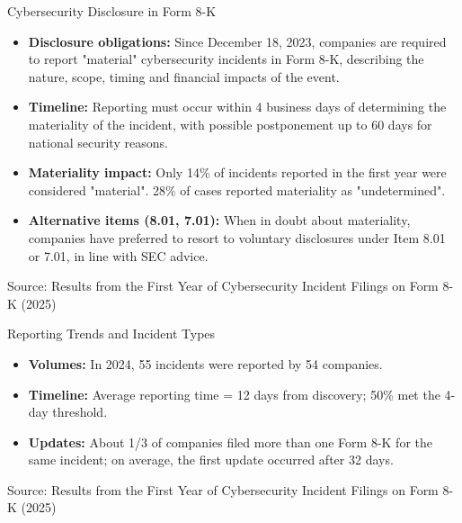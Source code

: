 \documentclass{beamer}
\begin{document}
\begin{frame}{Cybersecurity Disclosure in Form 8-K}
\begin{itemize}
\item \textbf{Disclosure obligations:} Since December 18, 2023, companies are required to report "material" cybersecurity incidents in Form 8-K, describing the nature, scope, timing and financial impacts of the event.
\item \textbf{Timeline:} Reporting must occur within 4 business days of determining the materiality of the incident, with possible postponement up to 60 days for national security reasons.
\item \textbf{Materiality impact:} Only 14\% of incidents reported in the first year were considered "material". 28\% of cases reported materiality as "undetermined".
\item \textbf{Alternative items (8.01, 7.01):} When in doubt about materiality, companies have preferred to resort to voluntary disclosures under Item 8.01 or 7.01, in line with SEC advice.
\end{itemize}

\vspace{0.5cm}
\footnotesize{Source: Results from the First Year of Cybersecurity Incident Filings on Form 8-K (2025)}
\end{frame}

\begin{frame}{Reporting Trends and Incident Types}
\begin{itemize}
\item \textbf{Volumes:} In 2024, 55 incidents were reported by 54 companies.
\item \textbf{Timeline:} Average reporting time = 12 days from discovery; 50\% met the 4-day threshold.
\item \textbf{Updates:} About 1/3 of companies filed more than one Form 8-K for the same incident; on average, the first update occurred after 32 days.
\end{itemize}

\vspace{2cm}
\footnotesize{Source: Results from the First Year of Cybersecurity Incident Filings on Form 8-K (2025)}
\end{frame}
\end{document}
